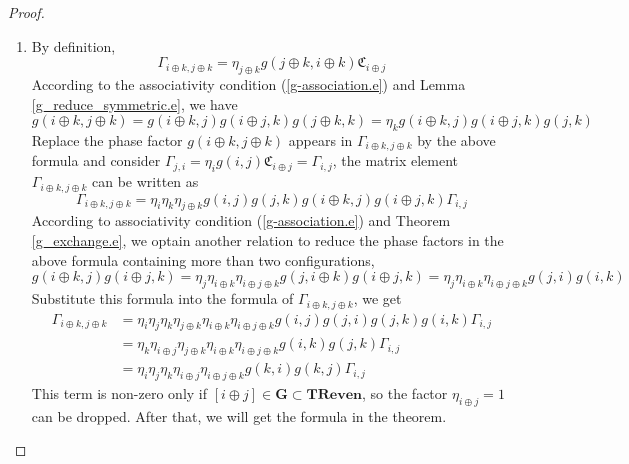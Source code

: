 \documentclass[12font]{article}
\theoremstyle{definition}
\numberwithin{equation}{section}
\newcommand{\bo}[1]{\mathbf{#1}}
\newcommand{\TReven}{\bo{TReven}}
\newcommand{\Good}{\bo{G}}
\begin{document}
\begin{proof}
\begin{enumerate}
\[    \]
    Exchange the two entries of $g({i}\oplus{j},{k})$ using theorem \ref{g_exchange.e} again, one will get
    \[
    g({j}\oplus{k},{i}) = \eta_{{i}} \eta_{{k}} \eta_{{i}\oplus{j}} \eta_{{j}\oplus{k}} g({i},{j}) g({j},{k}) g({k},{i}\oplus{j})
    \]
    Plug this relation into the expression of $\Gamma_{i,j\oplus k}$, we opbtain
    \begin{align*}
        \Gamma_{i,j\oplus k} &= \eta_{{i}} \eta_{{k}} \eta_{{i}\oplus{j}} g({i},{j}) g({j},{k}) g({k},{i}\oplus{j}) \mathfrak{C}_{{i}\oplus{j}\oplus{k}}\\
        &= \eta_{{i}} \eta_{{i}\oplus{j}} g({i},{j}) g({j},{k}) \Gamma_{i\oplus j,k}
    \end{align*}
    Using theorem \ref{g_exchange.e} again to exchange the entries of $g({i},{j})$, we will get the equation given by the theorem.
    
  \item By definition,
    \[
    \Gamma_{i\oplus k, j\oplus k} = \eta_{j\oplus k}g(j\oplus k,i\oplus k)\mathfrak{C}_{i\oplus j}
    \]
    According to the associativity condition (\ref{g-association.e}) and Lemma \ref{g_reduce_symmetric.e}, we have
    \[
    g(i\oplus k, j\oplus k) = g(i\oplus k,j) g(i\oplus j,k) g(j\oplus k,k) = \eta_k g(i\oplus k,j) g(i\oplus j,k) g(j,k)
    \]
    Replace the phase factor $g(i\oplus k, j\oplus k)$ appears in $\Gamma_{i\oplus k, j\oplus k}$ by the above formula and consider $\Gamma_{j,i} = \eta_i g(i,j) \mathfrak{C}_{i\oplus j} = \Gamma_{i,j}$, the matrix element $\Gamma_{i\oplus k, j\oplus k}$ can be written as
    \[
    \Gamma_{i\oplus k, j\oplus k} = \eta_i \eta_k \eta_{j\oplus k} g(i,j) g(j,k) g(i\oplus k,j) g(i\oplus j,k) \Gamma_{i,j}
    \]
    According to associativity condition (\ref{g-association.e}) and Theorem \ref{g_exchange.e}, we optain another relation to reduce the phase factors in the above formula containing more than two configurations,
    \[
    g(i\oplus k,j) g(i\oplus j,k) = \eta_j \eta_{i\oplus k} \eta_{i\oplus j\oplus k} g(j,i\oplus k) g(i\oplus j,k) = \eta_j \eta_{i\oplus k} \eta_{i\oplus j\oplus k} g(j,i) g(i,k)
    \]
    Substitute this formula into the formula of $\Gamma_{i\oplus k,j\oplus k}$, we get
    \begin{align*}
      \Gamma_{i\oplus k, j\oplus k} &= \eta_i  \eta_j \eta_k \eta_{j\oplus k} \eta_{i\oplus k} \eta_{i\oplus j\oplus k} g(i,j) g(j,i) g(j,k) g(i,k) \Gamma_{i,j}\\ 
      &= \eta_k \eta_{i\oplus j}\eta_{j\oplus k} \eta_{i\oplus k} \eta_{i\oplus j\oplus k} g(i,k) g(j,k) \Gamma_{i,j} \\
      &= \eta_i \eta_j \eta_k \eta_{i\oplus j} \eta_{i\oplus j\oplus k}g(k,i) g(k,j) \Gamma_{i,j}
    \end{align*}
    This term is non-zero only if $[i\oplus j]\in \Good\subset\TReven$, so the factor $\eta_{i\oplus j} = 1$ can be dropped. After that, we will get the formula in the theorem.
  

\end{enumerate}
\end{proof}
\end{document}
